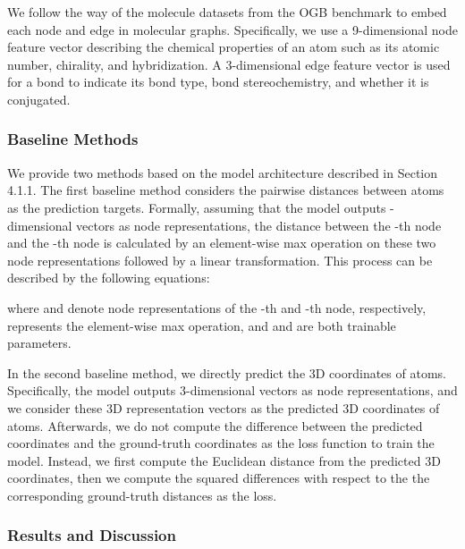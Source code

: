 \documentclass{article}
\begin{document}
We follow the way of the molecule datasets from the OGB \cite{hu2020open} benchmark to embed each node and edge in molecular graphs. Specifically, we use a 9-dimensional node feature vector describing the chemical properties of an atom such as its atomic number, chirality, and hybridization. A 3-dimensional edge feature vector is used for a bond to indicate its bond type, bond stereochemistry, and whether it is conjugated.

\subsubsection{Baseline Methods}
We provide two  methods based on the model architecture described in Section 4.1.1. The first baseline method considers the pairwise distances between atoms as the prediction targets. Formally, assuming that the model outputs -dimensional vectors as node representations, the distance  between the -th node and the -th node is calculated by an element-wise max operation on these two node representations followed by a linear transformation. This process can be described by the following equations:


where  and  denote node representations of the -th and -th node, respectively,  represents the element-wise max operation, and  and  are both trainable parameters.

In the second baseline method, we  directly predict the 3D coordinates of atoms. Specifically, the model outputs 3-dimensional vectors as node representations, and we consider these 3D representation vectors as the predicted 3D coordinates of atoms. Afterwards, we do not compute the difference between the predicted coordinates and the ground-truth coordinates as the loss function to train the model. Instead, we first compute the Euclidean distance  from the predicted 3D coordinates, then we compute the squared differences with respect to the  the corresponding ground-truth distances as the loss.

\subsubsection{Results and Discussion}
\end{document}
